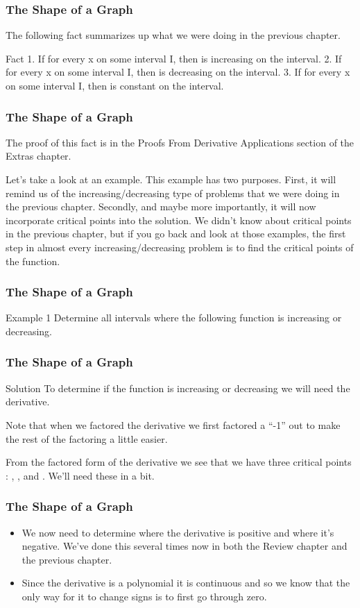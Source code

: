 \documentclass{beamer}
\begin{document}
\begin{frame} 
	\frametitle{The Shape of a Graph}

The following fact summarizes up what we were doing in the previous chapter. 

Fact
1.      If   for every x on some interval I, then  is increasing on the interval.
2.      If   for every x on some interval I, then  is decreasing on the interval.
3.      If   for every x on some interval I, then  is constant on the interval.
\end{frame}
\begin{frame} 
	\frametitle{The Shape of a Graph}
The proof of this fact is in the Proofs From Derivative Applications section of the Extras chapter.

Let’s take a look at an example.  This example has two purposes.  First, it will remind us of the increasing/decreasing type of problems that we were doing in the previous chapter.  Secondly, and maybe more importantly, it will now incorporate critical points into the solution.  We didn’t know about critical points in the previous chapter, but if you go back and look at those examples, the first step in almost every increasing/decreasing problem is to find the critical points of the function.
\end{frame}
\begin{frame} 
	\frametitle{The Shape of a Graph}
Example 1  Determine all intervals where the following function is increasing or decreasing.
\end{frame}
\begin{frame} 
	\frametitle{The Shape of a Graph}
Solution
To determine if the function is increasing or decreasing we will need the derivative.


Note that when we factored the derivative we first factored a “-1” out to make the rest of the factoring a little easier. 

From the factored form of the derivative we see that we have three critical points : ,  , and .  We’ll need these in a bit.
\end{frame}
\begin{frame} 
	\frametitle{The Shape of a Graph}
\begin{itemize}
\item We now need to determine where the derivative is positive and where it’s negative.  We’ve done this several times now in both the Review chapter and the previous chapter.  
\item Since the derivative is a polynomial it is continuous and so we know that the only way for it to change signs is to first go through zero.
\end{itemize}
\end{frame}
\end{document}
